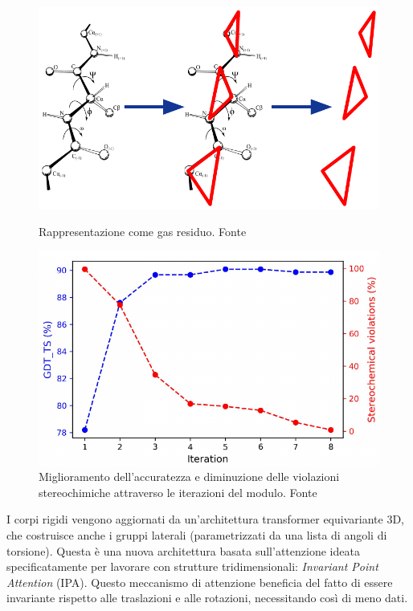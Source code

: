 \begin{figure}[!htb]
	\centering
	\includegraphics[scale=0.4]{images/gas-residue.png}
	\caption{Rappresentazione come gas residuo. Fonte\cite{AFslide}}
	\label{fig:gas-residuo}
	\endminipage\hfill
	\centering
	\includegraphics[scale=0.4]{images/struct-module.png}
	\caption{Miglioramento dell'accuratezza e diminuzione delle violazioni stereochimiche attraverso le iterazioni del modulo. Fonte \cite{AFslide}}
	\label{fig:structure-module-iterazioni}
	\endminipage\hfill
\end{figure}

\par I corpi rigidi vengono aggiornati da un'architettura transformer equivariante 3D, che costruisce anche i gruppi laterali (parametrizzati da una lista di angoli  di torsione). Questa è una nuova architettura basata sull'attenzione ideata specificatamente per lavorare con strutture tridimensionali: \textit{Invariant Point Attention} (IPA). Questo meccanismo di attenzione beneficia del fatto di essere invariante rispetto alle traslazioni e alle rotazioni, necessitando così di meno dati.

